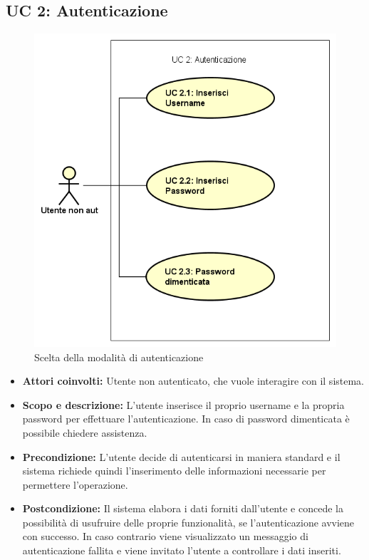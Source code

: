 \subsection{UC 2: Autenticazione}
	\begin{figure}[h]
		\centering
		\includegraphics[scale=0.8]{../../Casi D'uso/UC2.png}
		\caption{Scelta della modalità di autenticazione}
	\end{figure}
	\begin{itemize}
		\item \textbf{Attori coinvolti:} Utente non autenticato, che vuole interagire con il sistema. \\
		\item \textbf{Scopo e descrizione:} L'utente inserisce il proprio username e la propria password per effettuare l'autenticazione. In caso di password dimenticata è possibile chiedere assistenza. \\
		\item \textbf{Precondizione:} L'utente decide di autenticarsi in maniera standard e il sistema richiede quindi l'inserimento delle informazioni necessarie per permettere l'operazione. \\
		\item \textbf{Postcondizione:} Il sistema elabora i dati forniti dall'utente e concede la possibilità di usufruire delle proprie funzionalità, se l'autenticazione avviene con successo. In caso contrario viene visualizzato un messaggio di autenticazione fallita e viene invitato l'utente a controllare i dati inseriti. \\
	\end{itemize}
